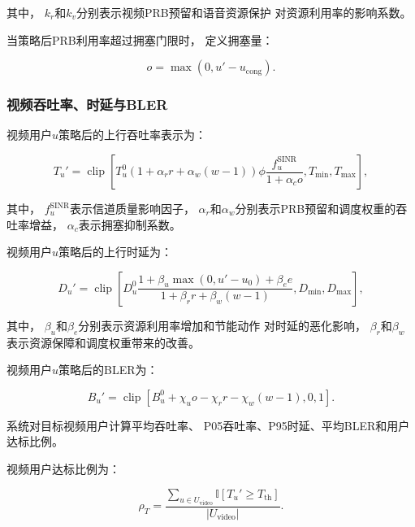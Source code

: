 \documentclass[lang=cn,12pt]{elegantbook}
\begin{document}
其中，
$k_r$和$k_v$分别表示视频PRB预留和语音资源保护
对资源利用率的影响系数。

当策略后PRB利用率超过拥塞门限时，
定义拥塞量：

\begin{equation}
o
=
\max
\left(
0,
u'-u_{\mathrm{cong}}
\right).
\label{eq:congestion_reduced}
\end{equation}


\subsubsection*{视频吞吐率、时延与BLER}

视频用户$u$策略后的上行吞吐率表示为：

\begin{equation}
T_u'
=
\operatorname{clip}
\left[
T_u^0
\left(
1+\alpha_rr+\alpha_w(w-1)
\right)
\phi
\frac{
f_u^{\mathrm{SINR}}
}{
1+\alpha_co
},
T_{\min},
T_{\max}
\right],
\label{eq:video_throughput_reduced}
\end{equation}

其中，
$f_u^{\mathrm{SINR}}$表示信道质量影响因子，
$\alpha_r$和$\alpha_w$分别表示PRB预留和调度权重的吞吐率增益，
$\alpha_c$表示拥塞抑制系数。

视频用户$u$策略后的上行时延为：

\begin{equation}
D_u'
=
\operatorname{clip}
\left[
D_u^0
\frac{
1+
\beta_u\max(0,u'-u_0)
+
\beta_ee
}{
1+
\beta_rr+
\beta_w(w-1)
},
D_{\min},
D_{\max}
\right],
\label{eq:video_delay_reduced}
\end{equation}

其中，
$\beta_u$和$\beta_e$分别表示资源利用率增加和节能动作
对时延的恶化影响，
$\beta_r$和$\beta_w$表示资源保障和调度权重带来的改善。

视频用户$u$策略后的BLER为：

\begin{equation}
B_u'
=
\operatorname{clip}
\left[
B_u^0
+
\chi_uo
-
\chi_rr
-
\chi_w(w-1),
0,
1
\right].
\label{eq:video_bler_reduced}
\end{equation}

系统对目标视频用户计算平均吞吐率、
P05吞吐率、P95时延、平均BLER和用户达标比例。

视频用户达标比例为：

\begin{equation}
\rho_T
=
\frac{
\sum_{u\in U_{\mathrm{video}}}
\mathbb{I}
\left[
T_u'\geq T_{\mathrm{th}}
\right]
}{
\left|
U_{\mathrm{video}}
\right|
}.
\label{eq:video_satisfaction_eval_reduced}
\end{equation}
\end{document}
